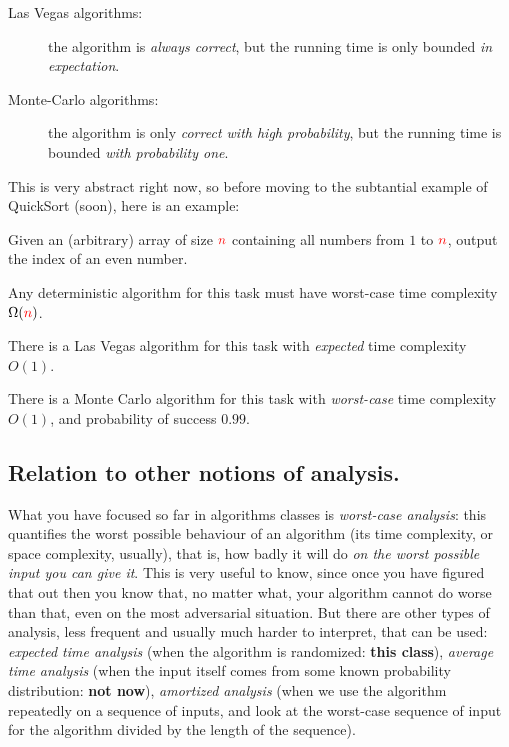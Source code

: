 \begin{description}
    \item[Las Vegas algorithms:] the algorithm is \emph{always correct}, but the running time is only bounded \emph{in expectation}. 
    \item[Monte-Carlo algorithms:] the algorithm is only \emph{correct with high probability}, but the running time is bounded \emph{with probability one}. 
\end{description}

This is very abstract right now, so before moving to the subtantial example of QuickSort (soon), here is an example:
\begin{framed}
    Given an (arbitrary) array of size ${\textcolor{red}{n}}$ containing all numbers from $1$ to ${\textcolor{red}{n}}$, output the index of an even number.
\end{framed}
\begin{claim}
Any deterministic algorithm  for this task must have worst-case time complexity $\Omega({\textcolor{red}{n}})$.
\end{claim}
\begin{claim}
There is a Las Vegas algorithm for this task with \emph{expected} time complexity $O(1)$.
\end{claim}
\begin{claim}
There is a Monte Carlo algorithm for this task with \emph{worst-case} time complexity $O(1)$, and probability of success $0.99$.
\end{claim}

\subsection{Relation to other notions of analysis.} What you have focused so far in algorithms classes is \emph{worst-case analysis}: this quantifies the worst possible behaviour of an algorithm (its time complexity, or space complexity, usually), that is, how badly it will do \emph{on the worst possible input you can give it}. This is very useful to know, since once you have figured that out then you know that, no matter what, your
algorithm cannot do worse than that, even on the most adversarial situation. But there are other types of analysis, less frequent and usually much harder to interpret, that can be used: \emph{expected
time analysis} (when the algorithm is randomized: \textbf{this class}), \emph{average time analysis} (when
the input itself comes from some known probability distribution: \textbf{not now}), \emph{amortized
analysis} (when we use the algorithm repeatedly on a sequence of inputs, and look at the worst-case sequence of input for the algorithm divided by the length of the sequence).

